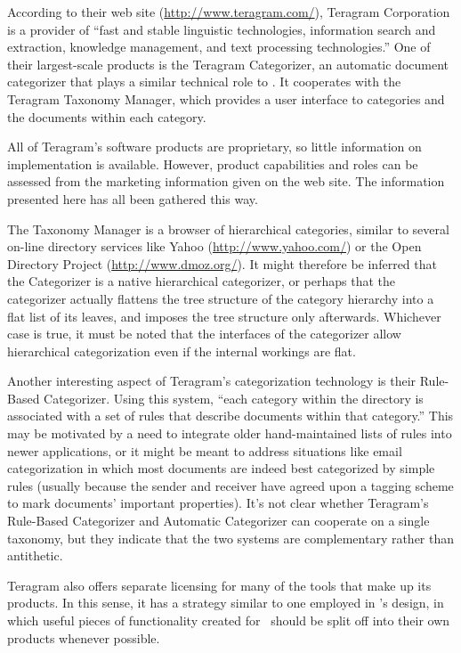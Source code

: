 According to their web site (\url{http://www.teragram.com/}), Teragram
Corporation is a provider of ``fast and stable linguistic
technologies, information search and extraction, knowledge management,
and text processing technologies.''  One of their largest-scale
products is the Teragram Categorizer, an automatic document
categorizer that plays a similar technical role to \aicat.
It cooperates with the Teragram Taxonomy Manager, which provides a
user interface to categories and the documents within each category.

All of Teragram's software products are proprietary, so little
information on implementation is available.  However, product
capabilities and roles can be assessed from the marketing information
given on the web site.  The information presented here has all been
gathered this way.

The Taxonomy Manager is a browser of hierarchical categories, similar
to several on-line directory services like Yahoo
(\url{http://www.yahoo.com/}) or the Open Directory Project
(\url{http://www.dmoz.org/}).  It might therefore be inferred that the
Categorizer is a native hierarchical categorizer, or perhaps that the
categorizer actually flattens the tree structure of the category
hierarchy into a flat list of its leaves, and imposes the tree
structure only afterwards.  Whichever case is true, it must be noted
that the interfaces of the categorizer allow hierarchical
categorization even if the internal workings are flat.

Another interesting aspect of Teragram's categorization technology is
their Rule-Based Categorizer.  Using this system, ``each category
within the directory is associated with a set of rules that describe
documents within that category.''  This may be motivated by a need to
integrate older hand-maintained lists of rules into newer
applications, or it might be meant to address situations like email
categorization in which most documents are indeed best categorized by
simple rules (usually because the sender and receiver have agreed upon
a tagging scheme to mark documents' important properties).  It's not
clear whether Teragram's Rule-Based Categorizer and Automatic
Categorizer can cooperate on a single taxonomy, but they indicate that
the two systems are complementary rather than antithetic.

Teragram also offers separate licensing for many of the tools that
make up its products.  In this sense, it has a strategy similar to one
employed in \aicat's design, in which useful pieces of
functionality created for \aicat\ should be split off into
their own products whenever possible.

